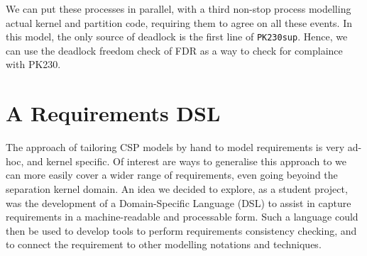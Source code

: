 We can put these processes in parallel, with a third non-stop process modelling actual kernel and partition code, requiring them to agree on all these events.
In this model, the only source of deadlock is the first line of \texttt{PK230sup}.
Hence, we can use the deadlock freedom check of FDR as a way to check for complaince
with PK230.




\section{A Requirements DSL}

The approach of tailoring CSP models by hand to model requirements
is very ad-hoc, and kernel specific.
Of interest are ways to generalise this approach to we can more easily
cover a wider range of requirements,
even going beyoind the separation kernel domain.
An idea we decided to explore,
as a student project\cite{Costelloe17},
was the development
of a Domain-Specific Language (DSL) to assist in capture requirements
in a machine-readable and processable form.
Such a language could then be used to develop tools to
perform requirements consistency checking,
and to connect the requirement to other modelling notations and techniques.

